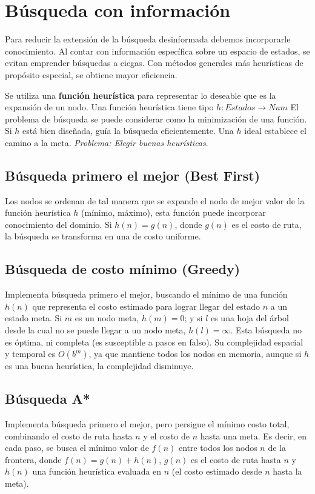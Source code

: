 \section{Búsqueda con información}
Para reducir la extensión de la búsqueda desinformada debemos incorporarle
conocimiento. Al contar con información específica sobre un espacio de estados,
se evitan emprender búsquedas a ciegas. Con métodos generales más heurísticas
de propósito especial, se obtiene mayor eficiencia.

Se utiliza una \textbf{función heurística} para representar lo deseable que es
la expansión de un nodo. Una función heurística tiene tipo $h : Estados \to Num$
El problema de búsqueda se puede considerar como la minimización de una función.
Si $h$ está bien diseñada, guía la búsqueda eficientemente. Una $h$ ideal
establece el camino a la meta. \textit{Problema: Elegir buenas heurísticas}.

\subsection{Búsqueda primero el mejor (Best First)}
Los nodos se ordenan de tal manera que se expande el nodo de mejor valor de la
función heurística $h$ (mínimo, máximo), esta función puede incorporar
conocimiento del dominio. Si $h(n) = g(n)$, donde $g(n)$ es el costo de ruta,
la búsqueda se transforma en una de costo uniforme.

\subsection{Búsqueda de costo mínimo (Greedy)}
Implementa búsqueda primero el mejor, buscando el mínimo de una función $h(n)$
que representa el costo estimado para lograr llegar del estado $n$ a un estado
meta. Si $m$ es un nodo meta, $h(m) = 0$; y si $l$ es una hoja del árbol desde
la cual no se puede llegar a un nodo meta, $h(l) = \infty$. Esta búsqueda no 
es óptima, ni completa (es susceptible a pasos en falso). Su complejidad
espacial y temporal es $O(b^m)$, ya que mantiene todos los nodos en memoria,
aunque si $h$ es una buena heurística, la complejidad disminuye.

\subsection{Búsqueda A*}
Implementa búsqueda primero el mejor, pero persigue el mínimo costo total,
combinando el costo de ruta hasta $n$ y el costo de $n$ hasta una meta. Es
decir, en cada paso, se busca el mínimo valor de $f(n)$ entre todos los nodos
$n$ de la frontera, donde $f(n) = g(n) + h(n)$, $g(n)$ es el costo de ruta
hasta $n$ y $h(n)$ una función heurística evaluada en $n$ (el costo estimado
desde $n$ hasta la meta).

